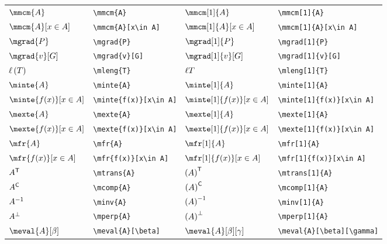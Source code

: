 \documentclass[10pt, a4paper]{article}
\newcommand{\ds}{\displaystyle}
\newcommand{\mleng}[2][0]{
	\ifthenelse{ \equal{#1}{0} }{\ell\left( #2 \right)}{\ell{#2}}
}
\newcommand{\mtrans}[2][0]{
	\ifthenelse{ \equal{#1}{0} }{{#2}^{\mathsf{T}}}{\left( #2 \right)^{\mathsf{T}}}
}
\newcommand{\mcomp}[2][0]{
	\ifthenelse{ \equal{#1}{0} }{{#2}^{\mathsf{C}}}{\left( #2 \right)^{\mathsf{C}}}
}
\newcommand{\minv}[2][0]{
	\ifthenelse{ \equal{#1}{0} }{{#2}^{-1}}{\left( #2 \right)^{-1}}
}
\newcommand{\mperp}[2][0]{
	\ifthenelse{ \equal{#1}{0} }{{#2}^{\perp}}{\left( #2 \right)^{\perp}}
}
\begin{document}
\begin{center}
\begin{tabular}{ll|ll}
		$ \mmcm{A} $ & \texttt{\textbackslash mmcm\{A\}} & $ \mmcm[1]{A} $ & \texttt{\textbackslash mmcm[1]\{A\}}\\
		$ \ds\mmcm{A}[x\in A] $ & \texttt{\textbackslash mmcm\{A\}[x\textbackslash in A]} & $ \ds\mmcm[1]{A}[x\in A] $ & \texttt{\textbackslash mmcm[1]\{A\}[x\textbackslash in A]}\\
		$ \mgrad{P} $ & \texttt{\textbackslash mgrad\{P\}} & $ \mgrad[1]{P} $ & \texttt{\textbackslash mgrad[1]\{P\}}\\
		$ \mgrad{v}[G] $ & \texttt{\textbackslash mgrad\{v\}[G]} & $ \mgrad[1]{v}[G] $ & \texttt{\textbackslash mgrad[1]\{v\}[G]}\\
		$ \mleng{T} $ & \texttt{\textbackslash mleng\{T\}} & $ \mleng[1]{T} $ & \texttt{\textbackslash mleng[1]\{T\}}\\
		$ \minte{A} $ & \texttt{\textbackslash minte\{A\}} & $ \minte[1]{A} $ & \texttt{\textbackslash minte[1]\{A\}}\\
		$ \ds\minte{f(x)}[x\in A] $ & \texttt{\textbackslash minte\{f(x)\}[x\textbackslash in A]} & $ \ds\minte[1]{f(x)}[x\in A] $ & \texttt{\textbackslash minte[1]\{f(x)\}[x\textbackslash in A]}\\
		$ \mexte{A} $ & \texttt{\textbackslash mexte\{A\}} & $ \mexte[1]{A} $ & \texttt{\textbackslash mexte[1]\{A\}}\\
		$ \ds\mexte{f(x)}[x\in A] $ & \texttt{\textbackslash mexte\{f(x)\}[x\textbackslash in A]} & $ \ds\mexte[1]{f(x)}[x\in A] $ & \texttt{\textbackslash mexte[1]\{f(x)\}[x\textbackslash in A]}\\
		$ \mfr{A} $ & \texttt{\textbackslash mfr\{A\}} & $ \mfr[1]{A} $ & \texttt{\textbackslash mfr[1]\{A\}}\\
		$ \ds\mfr{f(x)}[x\in A] $ & \texttt{\textbackslash mfr\{f(x)\}[x\textbackslash in A]} & $ \ds\mfr[1]{f(x)}[x\in A] $ & \texttt{\textbackslash mfr[1]\{f(x)\}[x\textbackslash in A]}\\
		$ \mtrans{A} $ & \texttt{\textbackslash mtrans\{A\}} & $ \mtrans[1]{A} $ & \texttt{\textbackslash mtrans[1]\{A\}}\\
		$ \mcomp{A} $ & \texttt{\textbackslash mcomp\{A\}} & $ \mcomp[1]{A} $ & \texttt{\textbackslash mcomp[1]\{A\}}\\
		$ \minv{A} $ & \texttt{\textbackslash minv\{A\}} & $ \minv[1]{A} $ & \texttt{\textbackslash minv[1]\{A\}}\\
		$ \mperp{A} $ & \texttt{\textbackslash mperp\{A\}} & $ \mperp[1]{A} $ & \texttt{\textbackslash mperp[1]\{A\}}\\
		$ \meval{A}[\beta] $ & \texttt{\textbackslash meval\{A\}[\textbackslash beta]} & $ \meval{A}[\beta][\gamma] $ & \texttt{\textbackslash meval\{A\}[\textbackslash beta][\textbackslash gamma]}\\

\end{tabular}
\end{center}
\end{document}
